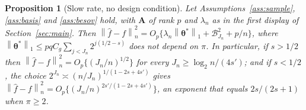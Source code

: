 \documentclass[12pt]{article} %
\theoremstyle{definition}
\theoremstyle{plain}
\newtheorem*{propositionold}{Proposition}
\newcommand{\norm}[1]{\left\lVert #1 \right\rVert}
\newcommand{\normn}[1]{\left\lVert #1 \right\rVert_{n}}
\newcommand{\lev}{j}
\newcommand{\btheta}{\boldsymbol{\theta}}
\newcommand{\thetastar}{\btheta^{*}}
\newcommand{\penn}{\lambda_{n}}
\newcommand{\seff}{s'}
\newcommand{\Amat}{\mathbf{A}}
\newcommand{\removedk}{\par\noindent[removed in k = 4]\par}
\begin{document}
{\color{gray}\removedk
\begin{propositionold}[Slow rate, no design condition]
Let Assumptions~\ref{ass:sample}, \ref{ass:basis} and \ref{ass:besov} hold,
with $\Amat$ of rank $p$ and $\penn$ as in the first display of
Section~\ref{sec:main}. Then
$\normn{\widehat{f}-f}^{2} = O_p\{\penn\norm{\thetastar}_{1} +
\mathcal{B}_{J_n}^{2} + p/n\}$, where
$\norm{\thetastar}_{1} \le pqC_g\sum_{\lev<J_n}2^{\lev(1/2-s)}$ does not
depend on $\pi$. In particular, if $s > 1/2$ then
$\normn{\widehat{f}-f}^{2} = O_p\{(J_n/n)^{1/2}\}$ for every
$J_n \ge \log_2 n/(4\seff)$; and if $s < 1/2$, the choice
$2^{J_n} \asymp (n/J_n)^{1/(1-2s+4\seff)}$ gives
$\normn{\widehat{f}-f}^{2} = O_p\{(J_n/n)^{2\seff/(1-2s+4\seff)}\}$, an
exponent that equals $2s/(2s+1)$ when $\pi \ge 2$.
\end{propositionold}
}
\end{document}
